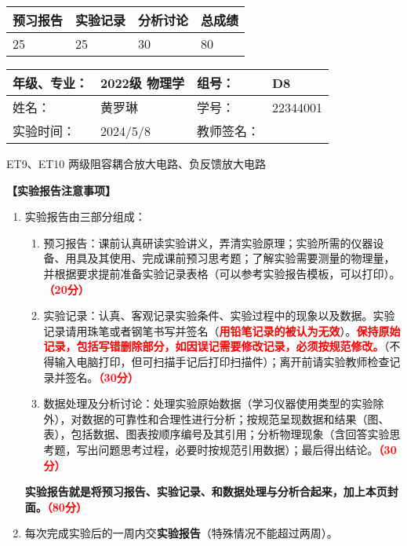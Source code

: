 \documentclass[dvipsnames, svgnames,a4paper,11pt]{article}
\begin{document}
	
	\begin{table}
		\renewcommand\arraystretch{1.7}
		\begin{tabularx}{\textwidth}{
				|X|X|X|X
				|X|X|X|X|}
			\hline
			\multicolumn{2}{|c|}{预习报告}&\multicolumn{2}{|c|}{实验记录}&\multicolumn{2}{|c|}{分析讨论}&\multicolumn{2}{|c|}{总成绩}\\
			\hline
			\LARGE25 & & \LARGE25 & & \LARGE30 & & \LARGE80 & \\
			\hline
		\end{tabularx}
	\end{table}
	
	\begin{table}
		\renewcommand\arraystretch{1.7}
		\begin{tabularx}{\textwidth}{|X|X|X|X|}
			\hline
			年级、专业： & 2022级 物理学 &组号： &D8 \\
			\hline
			姓名： &  黄罗琳  & 学号： &22344001   \\
			\hline
			实验时间： & 2024/5/8 & 教师签名： & \\
			\hline
		\end{tabularx}
	\end{table}
	
	\begin{center}
		\LARGE ET9、ET10 \quad 两级阻容耦合放大电路、负反馈放大电路 
		
	\end{center}
	
	
	\textbf{【实验报告注意事项】}
	\begin{enumerate}
		\item 实验报告由三部分组成：
		\begin{enumerate}
			\item 预习报告：课前认真研读实验讲义，弄清实验原理；实验所需的仪器设备、用具及其使用、完成课前预习思考题；了解实验需要测量的物理量，并根据要求提前准备实验记录表格（可以参考实验报告模板，可以打印）。\textcolor{red}{\textbf{（20分）}}
			\item 实验记录：认真、客观记录实验条件、实验过程中的现象以及数据。实验记录请用珠笔或者钢笔书写并签名（\textcolor{red}{\textbf{用铅笔记录的被认为无效}}）。\textcolor{red}{\textbf{保持原始记录，包括写错删除部分，如因误记需要修改记录，必须按规范修改。}}（不得输入电脑打印，但可扫描手记后打印扫描件）；离开前请实验教师检查记录并签名。\textcolor{red}{\textbf{（30分）}}
			\item 数据处理及分析讨论：处理实验原始数据（学习仪器使用类型的实验除外），对数据的可靠性和合理性进行分析；按规范呈现数据和结果（图、表），包括数据、图表按顺序编号及其引用；分析物理现象（含回答实验思考题，写出问题思考过程，必要时按规范引用数据）；最后得出结论。\textcolor{red}{\textbf{（30分）}}
		\end{enumerate}
		\textbf{实验报告就是将预习报告、实验记录、和数据处理与分析合起来，加上本页封面。\textcolor{red}{（80分）}}
		\item 每次完成实验后的一周内交\textbf{实验报告}（特殊情况不能超过两周）。
		
	\end{enumerate}
	
\end{document}
